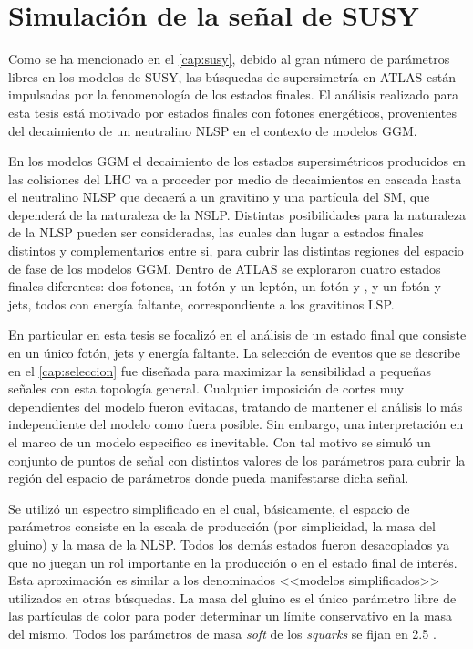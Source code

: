 \section{Simulación de la señal de SUSY}\label{sec:sig_samples}

Como se ha mencionado en el \cref{cap:susy}, debido al gran número de parámetros
libres en los modelos de SUSY, las búsquedas de supersimetría en ATLAS están
impulsadas por la fenomenología de los estados finales. El análisis realizado
para esta tesis está motivado por estados finales con fotones energéticos,
provenientes del decaimiento de un neutralino NLSP en el contexto de modelos
GGM.

En los modelos GGM el decaimiento de los estados supersimétricos producidos en
las colisiones del LHC va a proceder por medio de decaimientos en cascada hasta
el neutralino NLSP que decaerá a un gravitino y una partícula del SM, que
dependerá de la naturaleza de la NSLP. Distintas posibilidades para la
naturaleza de la NLSP pueden ser consideradas, las cuales dan lugar a estados
finales distintos y complementarios entre si, para cubrir las distintas regiones
del espacio de fase de los modelos GGM. Dentro de ATLAS se exploraron cuatro
estados finales diferentes: dos fotones, un fotón y un leptón, un fotón y
{\bjets}, y un fotón y jets, todos con energía faltante, correspondiente a los
gravitinos LSP.

En particular en esta tesis se focalizó en el análisis de un estado final que
consiste en un único fotón, jets y energía faltante.
La selección de eventos que se describe en el \cref{cap:seleccion} fue diseñada para
maximizar la sensibilidad a pequeñas señales con esta topología general.
Cualquier imposición de cortes muy dependientes del modelo fueron evitadas,
tratando de mantener el análisis lo más independiente del modelo como fuera
posible. Sin embargo, una interpretación en el marco de un modelo especifico es
inevitable. Con tal motivo se simuló un conjunto de puntos de señal con
distintos valores de los parámetros para cubrir la región del espacio de
parámetros donde pueda manifestarse dicha señal.


Se utilizó un espectro simplificado en el cual, básicamente, el espacio de
parámetros consiste en la escala de producción (por simplicidad, la masa del
gluino) y la masa de la NLSP. Todos los demás estados fueron desacoplados ya que
no juegan un rol importante en la producción o en el estado final de interés.
Esta aproximación es similar a los denominados <<modelos simplificados>>
utilizados en otras búsquedas.
La masa del gluino es el único parámetro libre de las partículas de color para
poder determinar un límite conservativo en la masa del mismo. Todos los
parámetros de masa \emph{soft} de los \emph{squarks} se fijan en 2.5 \tev.

